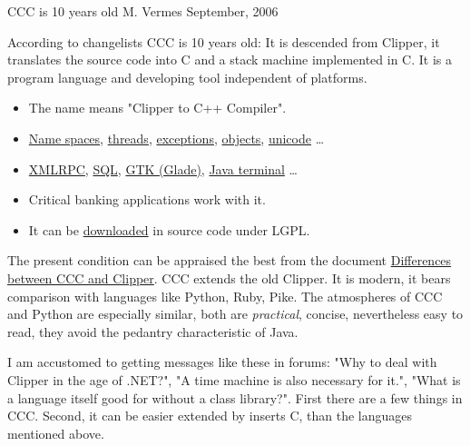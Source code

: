 
\pagetitle%
{CCC is 10 years old}%
{M. Vermes}%
{September, 2006}

\medskip

According to changelists CCC is 10 years old: It is descended from
Clipper, it translates the source code into C and a stack machine 
implemented in C. It is a program language and developing tool
independent of platforms.


\begin{itemize}
\item   
    The name means {"}Clipper to C++ Compiler".
\item 
    \href{http://ccc.comfirm.hu/ccc3/ccc-clipper-elteresek.html#NAMESPACE}{Name spaces}, 
    \href{http://ccc.comfirm.hu/ccc3/ccc-clipper-elteresek.html#THREADS}{threads}, 
    \href{http://ccc.comfirm.hu/ccc3/exception.html}{exceptions},
    \href{http://ccc.comfirm.hu/ccc3/objektum.html}{objects},
    \href{http://ccc.comfirm.hu/ccc3/ccc3_ujdonsagok.html}{unicode}
    \ldots
\item 
    \href{http://ccc.comfirm.hu/ccc3/xmlrpc-framework.html}{XMLRPC}, 
    \href{http://ccc.comfirm.hu/ccc3/sql2.html}{SQL}, 
    \href{http://ccc.comfirm.hu/ccc3/cccgtk.html}{GTK (Glade)},
    \href{http://ccc.comfirm.hu/ccc3/jterminal.html}{Java terminal} \ldots
\item
    Critical banking applications work with it.
\item   
    It can be 
    \href{git://comfirm.hu/ccc3.git}{downloaded} 
    in source code under LGPL.
\end{itemize}

The present condition can be appraised the best from the document 
\href{http://ccc.comfirm.hu/ccc3/ccc-clipper-elteresek.html}%
{Differences between CCC and Clipper}.
CCC extends the old Clipper.
It is modern, it bears comparison with languages like 
Python, Ruby, Pike.
The atmospheres of CCC and Python are especially similar, both are  
{\em practical}, concise, nevertheless easy to read, they avoid 
the pedantry characteristic of Java.

I am accustomed to getting messages like these in forums:  
{"}Why to deal with Clipper in the age of .NET?",  
{"}A time machine is also necessary for it.",
{"}What is a language itself good for without a class library?".
First there are a few things in CCC. Second, it can be easier extended
by inserts C, than the languages mentioned above.

